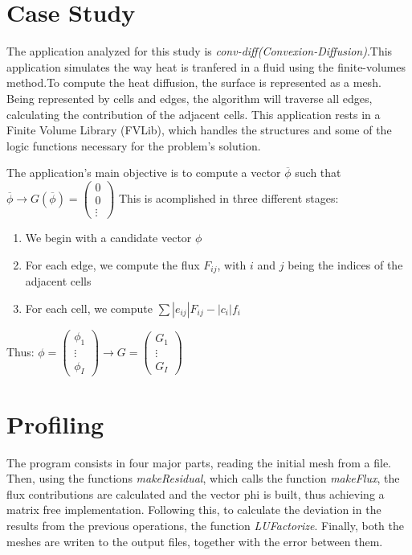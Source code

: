 \documentclass[a4paper,10pt,openright,openbib,twocolumn]{article}
\begin{document}
\section{Case Study}    %

The application analyzed for this study is \emph{conv-diff(Convexion-Diffusion)}.This application simulates the way heat is tranfered in a fluid using the finite-volumes method.To compute the heat diffusion, the surface is represented as a mesh. Being represented by cells and edges, the algorithm will traverse all edges, calculating the contribution of the adjacent cells. This application rests in a Finite Volume Library (FVLib), which handles the structures and some of the logic functions necessary for the problem's solution.

The application's main objective is to compute a vector $\overline{\phi}$ such that $\overline{\phi} \longrightarrow G(\overline{\phi}) = \left(\begin{array}{c}
0\\ 
0\\
\vdots\end{array}\right)$
This is acomplished in three different stages:
\begin{enumerate}
    \item {We begin with a candidate vector $\phi$} 
    \item {For each edge, we compute the flux $F_{ij}$, with $i$ and $j$ being the indices of the adjacent cells}
    \item {For each cell, we compute $\sum |e_{ij}| F_{ij} - |c_i| f_i$}
\end{enumerate}
Thus: $\phi = \left(\begin{array}{c}
\phi_1\\
\vdots\\
\phi_I
\end{array}\right) \longrightarrow G = \left(\begin{array}{c}
G_1\\
\vdots\\
G_I
\end{array}\right)$


\section{Profiling}    %

The program consists in four major parts, reading the initial mesh from a file. Then, using the functions \emph{makeResidual}, which calls the function \emph{makeFlux}, the flux contributions are calculated and the vector phi is built, thus achieving a matrix free implementation. Following this, to calculate the deviation in the results from the previous operations, the function \emph{LUFactorize}. Finally, both the meshes are writen to the output files, together with the error between them.
 
\end{document}
